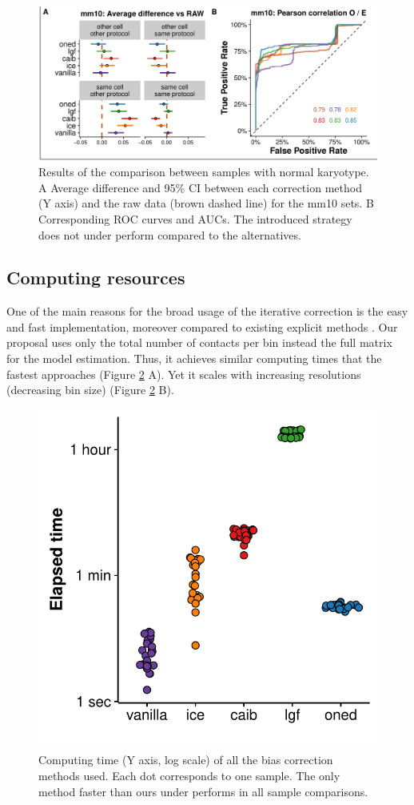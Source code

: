 \documentclass{bioinfo}
\begin{document}
\begin{figure}
	\centerline{\includegraphics[width=.50\textwidth]{img/correlation_normal_figure4.pdf}}
	\caption{
		Results of the comparison between samples with normal karyotype. A Average difference and 95\% CI between each correction method (Y axis) and the raw data (brown dashed line) for the mm10 sets. B Corresponding ROC curves and AUCs. The introduced strategy does not under perform compared to the alternatives.
	}\label{fig:normal}
\end{figure}

\subsection{Computing resources}

One of the main reasons for the broad usage of the iterative correction \citep{imakaev2012iterative} is the easy and fast implementation, moreover compared to existing explicit methods \citep{servant2012hitc}. Our proposal uses only the total number of contacts per bin instead the full matrix for the model estimation. Thus, it achieves similar computing times that the fastest approaches (Figure \ref{fig:times} A). Yet it scales with increasing resolutions (decreasing bin size) (Figure \ref{fig:times} B).

\begin{figure}
	\centerline{\includegraphics[width=.35\textwidth]{img/times_sina_figure5.pdf}}
	\caption{
		Computing time (Y axis, log scale) of all the bias correction methods used. Each dot corresponds to one sample. The only method faster than ours under performs in all sample comparisons.
	}\label{fig:times}
\end{figure}
\end{document}
